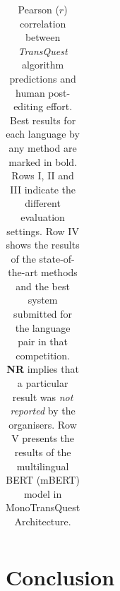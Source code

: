 \begin{table}[t]
\begin{center}
{\begin{tabular}{l l  c c c c c c c c}
			\bottomrule
		\end{tabular}
	}
	\end{center}
	\caption[Pearson correlation between TransQuest algorithm predictions and human post-editing effort]{Pearson ($r$) correlation between \textit{TransQuest} algorithm predictions and human post-editing effort. Best results for each language by any method are marked in bold. Rows I, II and III indicate the different evaluation settings. Row IV shows the results of the state-of-the-art methods and the best system submitted for the language pair in that competition. \textbf{NR} implies that a particular result 
		was \textit{not reported} by the organisers. Row V presents the results of the multilingual BERT (mBERT) model in MonoTransQuest Architecture.} 
	\label{tab:hter_prediction}
\end{table}
\section{Conclusion}